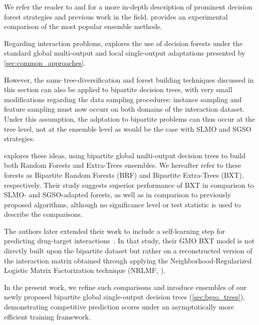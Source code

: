 We refer the reader to \textcite{sagi2018ensemble} and \textcite{fawagreh2014random} for a more in-depth description of prominent decision forest strategies and previous work in the field. \textcite{amasyali2011comparison} provides an experimental comparison of the most popular ensemble methods.  %

Regarding interaction problems, \textcite{schrynemackers2015classifying} explores the use of decision forests under the standard global multi-output and local single-output adaptations presented by \autoref{sec:common_approaches}.

However, the same tree-diversification and forest building techniques discussed in this section can also be applied to bipartite decision trees, with very small modifications regarding the data sampling procedures: instance sampling and feature sampling must now occurr on both domains of the interaction dataset. Under this assumption, the adptation to bipartite problems can thus occur at the tree level, not at the ensemble level as would be the case with SLMO and SGSO strategies.

\cite{pliakos2019network} explores these ideas, using bipartite global multi-output decision trees to build both Random Forests and Extra-Trees ensembles. We hereafter refer to these forests as Bipartite Random Forests (BRF) and Bipartite Extra-Trees (BXT), respectively. Their study suggests superior performance of BXT in comparison to SLMO- and SGSO-adapted forests, as well as in comparison to previously proposed algorithms, although no significance level or test statistic is used to describe the comparisons.

The authors later extended their work to include a self-learning step for predicting drug-target interactions~\cite{pliakos2020drugtarget}. In that study, their GMO BXT model is not directly built upon the bipartite dataset but rather on a reconstructed version of the interaction matrix obtained through applying the Neighborhood-Regularized Logistic Matrix Factorization technique (NRLMF, \textcite{liu2016neighborhood}).

In the present work, we refine such comparisons and inroduce ensembles of our newly proposed bipartite global single-output decision trees (\autoref{sec:bgso_trees}), demonstrating competitive prediction scores under an asymptotically more efficient training framework.


